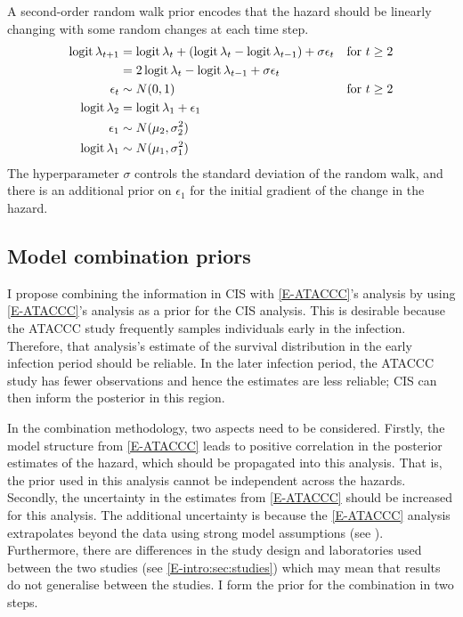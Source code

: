 \documentclass[thesis.tex]{subfiles}
\begin{document}
A second-order random walk prior encodes that the hazard should be linearly changing with some random changes at each time step.
\begin{align}
  \operatorname{logit}\lambda_{t+1}
  &= \operatorname{logit}\lambda_t + (\operatorname{logit}\lambda_t - \operatorname{logit}\lambda_{t-1}) + \sigma \epsilon_t &\text{for $t \geq 2$} \\
  &= 2\operatorname{logit}\lambda_t - \operatorname{logit}\lambda_{t-1} + \sigma \epsilon_t \\
  \epsilon_t &\sim N(0, 1) &\text{for $t \geq 2$}  \\
  \operatorname{logit}\lambda_2 &= \operatorname{logit}\lambda_1 + \epsilon_1 \\\
  \epsilon_1 &\sim N(\mu_2, \sigma_2^2) \\
  \operatorname{logit} \lambda_1 &\sim N(\mu_1, \sigma_1^2)
\end{align}
The hyperparameter $\sigma$ controls the standard deviation of the random walk, and there is an additional prior on $\epsilon_1$ for the initial gradient of the change in the hazard.

\subsection{Model combination priors} \label{perf-test:sec:informative-priors}

I propose combining the information in CIS with \cref{E-ATACCC}'s analysis by using \cref{E-ATACCC}'s analysis as a prior for the CIS analysis.
This is desirable because the ATACCC study frequently samples individuals early in the infection.
Therefore, that analysis's estimate of the survival distribution in the early infection period should be reliable.
In the later infection period, the ATACCC study has fewer observations and hence the estimates are less reliable; CIS can then inform the posterior in this region.

In the combination methodology, two aspects need to be considered.
Firstly, the model structure from \cref{E-ATACCC} leads to positive correlation in the posterior estimates of the hazard, which should be propagated into this analysis.
That is, the prior used in this analysis cannot be independent across the hazards.
Secondly, the uncertainty in the estimates from \cref{E-ATACCC} should be increased for this analysis.
The additional uncertainty is because the \cref{E-ATACCC} analysis extrapolates beyond the data using strong model assumptions (see ).
Furthermore, there are differences in the study design and laboratories used between the two studies (see \cref{E-intro:sec:studies}) which may mean that results do not generalise between the studies.
I form the prior for the combination in two steps.
\end{document}
